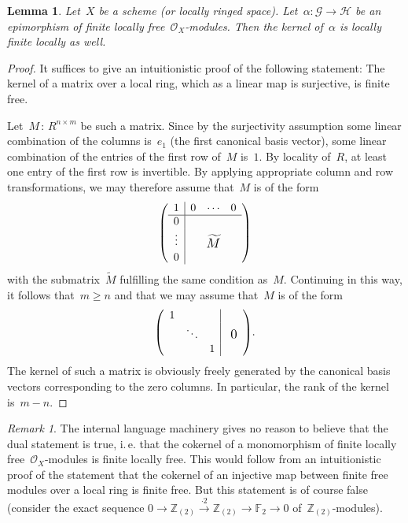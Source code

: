 \documentclass[10pt]{amsart}
\makeatletter
\theoremstyle{definition}
\theoremstyle{plain}
\newtheorem{lemma}[defn]{Lemma}
\theoremstyle{remark}
\newtheorem{rem}[defn]{Remark}
\newcommand{\ZZ}{\mathbb{Z}}
\newcommand{\FF}{\mathbb{F}}
\renewcommand{\G}{\mathcal{G}}
\renewcommand{\H}{\mathcal{H}}
\renewcommand{\O}{\mathcal{O}}
\newcommand{\?}{\,{:}\,}
\renewcommand{\_}{\mathpunct{.}\,}
\newcommand{\lra}{\longrightarrow}
\newcommand{\ie}{i.\,e.\@\xspace}
\makeatother
\begin{document}
\begin{lemma}\label{lemma:kernel-of-epi-fingen}
Let~$X$ be a scheme (or locally ringed space). Let~$\alpha : \G
\to \H$ be an epimorphism of finite locally free~$\O_X$-modules. Then the
kernel of~$\alpha$ is locally finite locally as well.\end{lemma}
\begin{proof}It suffices to give an intuitionistic proof of the following
statement: The kernel of a matrix over a local ring, which as a linear map is
surjective, is finite free.

Let~$M \? R^{n \times m}$ be such a matrix. Since by the surjectivity
assumption some linear combination of the columns is~$e_1$ (the first canonical
basis vector), some linear combination of the entries of the first row of~$M$
is~$1$. By locality of~$R$, at least one entry of the first row is invertible.
By applying appropriate column and row transformations, we may therefore assume that~$M$
is of the form
\[ \left(
  \begin{array}{c|ccc}
    1 & 0 & \cdots & 0 \\ \hline
    0 & \multicolumn{3}{c}{\multirow{3}{*}{\raisebox{-5mm}{\scalebox{1.2}{$\widetilde M$}}}} \\
    \raisebox{2pt}{\vdots} & & & \\
    0 & & &
  \end{array}
\right) \]
with the submatrix~$\widetilde M$ fulfilling the same condition as~$M$.
Continuing in this way, it follows that~$m \geq n$ and that we may assume
that~$M$ is of the form
\[ \left(
  \begin{array}{ccc|c}
    1 & & & \multirow{3}{*}{\raisebox{-3mm}{\scalebox{1.2}{\ 0}}} \\
    & \ddots && \\
    && 1
  \end{array}
\right)\!. \]
The kernel of such a matrix is obviously freely generated by the canonical
basis vectors corresponding to the zero columns. In particular, the rank of the
kernel is~$m-n$.
\end{proof}

\begin{rem}The internal language machinery gives no reason to believe that the
dual statement is true, \ie that the cokernel of a monomorphism of finite
locally free~$\O_X$-modules is finite locally free. This would follow from
an intuitionistic proof of the statement that the cokernel of an injective map
between finite free modules over a local ring is finite free. But this
statement is of course false (consider the exact sequence
$0 \lra \ZZ_{(2)} \stackrel{\cdot 2}{\lra} \ZZ_{(2)} \lra \FF_2 \lra 0$
of~$\ZZ_{(2)}$-modules).
\end{rem}
\end{document}
